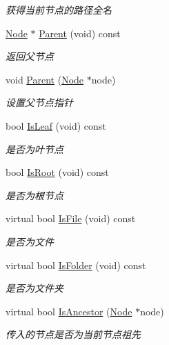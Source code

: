 \begin{DoxyCompactItemize}
\begin{DoxyCompactList}\small\item\em 获得当前节点的路径全名 \end{DoxyCompactList}\item 
\hyperlink{class_file_sys_1_1_node}{Node} $\ast$ \hyperlink{class_file_sys_1_1_node_a2de4a78fc6b8885d559f6d131f24cb8b}{Parent} (void) const 
\begin{DoxyCompactList}\small\item\em 返回父节点 \end{DoxyCompactList}\item 
void \hyperlink{class_file_sys_1_1_node_ae2519cd1f81789bb3e6ebb08a0da0916}{Parent} (\hyperlink{class_file_sys_1_1_node}{Node} $\ast$node)
\begin{DoxyCompactList}\small\item\em 设置父节点指针 \end{DoxyCompactList}\item 
bool \hyperlink{class_file_sys_1_1_node_a3a69d3f3c6021bb72057a490a799c4c6}{Is\-Leaf} (void) const 
\begin{DoxyCompactList}\small\item\em 是否为叶节点 \end{DoxyCompactList}\item 
bool \hyperlink{class_file_sys_1_1_node_afa19c01f76b54849fd4a95bc7e0ea7e2}{Is\-Root} (void) const 
\begin{DoxyCompactList}\small\item\em 是否为根节点 \end{DoxyCompactList}\item 
virtual bool \hyperlink{class_file_sys_1_1_node_abced0abf2d6f54f6b9887189c51c9bd1}{Is\-File} (void) const 
\begin{DoxyCompactList}\small\item\em 是否为文件 \end{DoxyCompactList}\item 
virtual bool \hyperlink{class_file_sys_1_1_node_ad93cc76a230827623b8fd1dbc255a9b2}{Is\-Folder} (void) const 
\begin{DoxyCompactList}\small\item\em 是否为文件夹 \end{DoxyCompactList}\item 
virtual bool \hyperlink{class_file_sys_1_1_node_a1c498398bb44692a5fe147e7466696bb}{Is\-Ancestor} (\hyperlink{class_file_sys_1_1_node}{Node} $\ast$node)
\begin{DoxyCompactList}\small\item\em 传入的节点是否为当前节点祖先 \end{DoxyCompactList}\item 

\end{DoxyCompactItemize}
